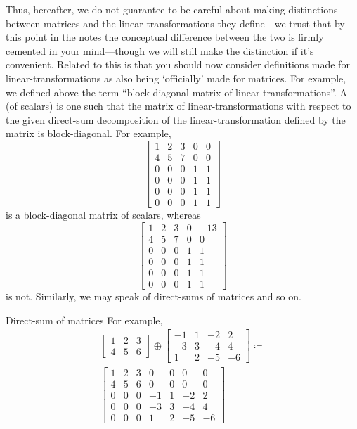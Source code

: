 Thus, hereafter, we do not guarantee to be careful about making distinctions between matrices and the linear-transformations they define---we trust that by this point in the notes the conceptual difference between the two is firmly cemented in your mind---though we will still make the distinction if it's convenient.  Related to this is that you should now consider definitions made for linear-transformations as also being `officially' made for matrices.  For example, we defined above the term ``block-diagonal matrix of linear-transformations''.  A  (of scalars) is one such that the matrix of linear-transformations with respect to the given direct-sum decomposition of the linear-transformation defined by the matrix is block-diagonal.  For example,
\begin{equation}
	\begin{bmatrix}1 & 2 & 3 & 0 & 0 \\ 4 & 5 & 7 & 0 & 0 \\ 0 & 0 & 0 & 1 & 1 \\ 0 & 0 & 0 & 1 & 1 \\ 0 & 0 & 0 & 1 & 1 \\ 0 & 0 & 0 & 1 & 1\end{bmatrix}
\end{equation}
is a block-diagonal matrix of scalars, whereas
\begin{equation}
	\begin{bmatrix}1 & 2 & 3 & 0 & -13 \\ 4 & 5 & 7 & 0 & 0 \\ 0 & 0 & 0 & 1 & 1 \\ 0 & 0 & 0 & 1 & 1 \\ 0 & 0 & 0 & 1 & 1 \\ 0 & 0 & 0 & 1 & 1\end{bmatrix}
\end{equation}
is not.  Similarly, we may speak of direct-sums of matrices and so on.
\begin{exm}{Direct-sum of matrices}{}
	For example,
	\begin{equation}
		\begin{multlined}
			\begin{bmatrix}1 & 2 & 3 \\ 4 & 5 & 6\end{bmatrix}\oplus \begin{bmatrix}-1 & 1 & -2 & 2 \\ -3 & 3 & -4 & 4 \\ 1 & 2 & -5 & -6\end{bmatrix}\coloneqq \\ \begin{bmatrix}1 & 2 & 3 & 0 & 0 & 0 & 0 \\ 4 & 5 & 6 & 0 & 0 & 0 & 0 \\ 0 & 0 & 0 & -1 & 1 & -2 & 2 \\ 0 & 0 & 0 & -3 & 3 & -4 & 4 \\ 0 & 0 & 0 & 1 & 2 & -5 & -6\end{bmatrix}
		\end{multlined}
	\end{equation}
\end{exm}

